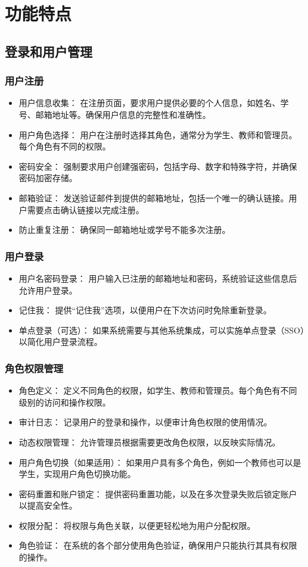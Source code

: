 \documentclass{article}
\begin{document}
\section{功能特点}

\subsection{登录和用户管理}
\subsubsection{用户注册}
\begin{itemize}
        \item 用户信息收集： 在注册页面，要求用户提供必要的个人信息，如姓名、学号、邮箱地址等。确保用户信息的完整性和准确性。
        \item 用户角色选择： 用户在注册时选择其角色，通常分为学生、教师和管理员。每个角色有不同的权限。
        \item 密码安全： 强制要求用户创建强密码，包括字母、数字和特殊字符，并确保密码加密存储。
        \item 邮箱验证： 发送验证邮件到提供的邮箱地址，包括一个唯一的确认链接。用户需要点击确认链接以完成注册。
        \item 防止重复注册： 确保同一邮箱地址或学号不能多次注册。   
\end{itemize}

\subsubsection{用户登录}
\begin{itemize}
        \item 用户名密码登录： 用户输入已注册的邮箱地址和密码，系统验证这些信息后允许用户登录。
        \item 记住我： 提供“记住我”选项，以便用户在下次访问时免除重新登录。
        \item 单点登录（可选）： 如果系统需要与其他系统集成，可以实施单点登录（SSO）以简化用户登录流程。 
\end{itemize}
\subsubsection{角色权限管理}
\begin{itemize}
        \item 角色定义： 定义不同角色的权限，如学生、教师和管理员。每个角色有不同级别的访问和操作权限。
        \item 审计日志： 记录用户的登录和操作，以便审计角色权限的使用情况。
        \item 动态权限管理： 允许管理员根据需要更改角色权限，以反映实际情况。
        \item 用户角色切换（如果适用）： 如果用户具有多个角色，例如一个教师也可以是学生，实现用户角色切换功能。
        \item 密码重置和账户锁定： 提供密码重置功能，以及在多次登录失败后锁定账户以提高安全性。
        \item 权限分配： 将权限与角色关联，以便更轻松地为用户分配权限。 
        \item 角色验证： 在系统的各个部分使用角色验证，确保用户只能执行其具有权限的操作。
\end{itemize}
\end{document}
